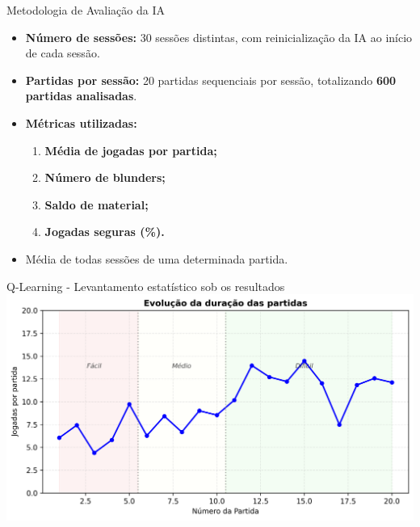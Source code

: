 \documentclass{beamer}
\begin{document}
\begin{frame}{Metodologia de Avaliação da IA}
  \begin{itemize}
    \item \textbf{Número de sessões:} 30 sessões distintas, com reinicialização da IA ao início de cada sessão.
    
    \item \textbf{Partidas por sessão:} 20 partidas sequenciais por sessão, totalizando \textbf{600 partidas analisadas}.

    \item \textbf{Métricas utilizadas:}
    \begin{enumerate}
      \item \textbf{Média de jogadas por partida;}
      \item \textbf{Número de blunders;}
      \item \textbf{Saldo de material;}
      \item \textbf{Jogadas seguras (\%).}
    \end{enumerate}
    \item Média de todas sessões de uma determinada partida.
  \end{itemize}
\end{frame}

\begin{frame}[plain]{Q-Learning - Levantamento estatístico sob os resultados}
  \centering
  \includegraphics[width=\paperwidth,height=0.7\paperheight,keepaspectratio]{images/jogadas_niveis.png}
\end{frame}
\end{document}
